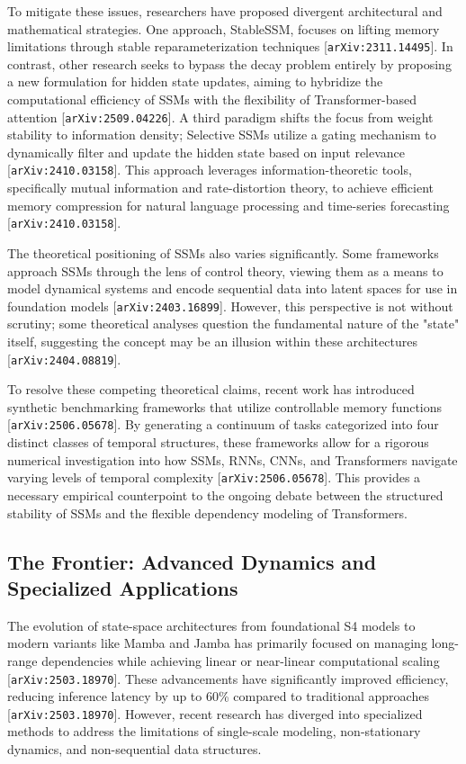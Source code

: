 \documentclass[11pt]{article}
\begin{document}
To mitigate these issues, researchers have proposed divergent architectural and mathematical strategies. One approach, StableSSM, focuses on lifting memory limitations through stable reparameterization techniques [\texttt{arXiv:2311.14495}]. In contrast, other research seeks to bypass the decay problem entirely by proposing a new formulation for hidden state updates, aiming to hybridize the computational efficiency of SSMs with the flexibility of Transformer-based attention [\texttt{arXiv:2509.04226}]. A third paradigm shifts the focus from weight stability to information density; Selective SSMs utilize a gating mechanism to dynamically filter and update the hidden state based on input relevance [\texttt{arXiv:2410.03158}]. This approach leverages information-theoretic tools, specifically mutual information and rate-distortion theory, to achieve efficient memory compression for natural language processing and time-series forecasting [\texttt{arXiv:2410.03158}].

The theoretical positioning of SSMs also varies significantly. Some frameworks approach SSMs through the lens of control theory, viewing them as a means to model dynamical systems and encode sequential data into latent spaces for use in foundation models [\texttt{arXiv:2403.16899}]. However, this perspective is not without scrutiny; some theoretical analyses question the fundamental nature of the "state" itself, suggesting the concept may be an illusion within these architectures [\texttt{arXiv:2404.08819}].

To resolve these competing theoretical claims, recent work has introduced synthetic benchmarking frameworks that utilize controllable memory functions [\texttt{arXiv:2506.05678}]. By generating a continuum of tasks categorized into four distinct classes of temporal structures, these frameworks allow for a rigorous numerical investigation into how SSMs, RNNs, CNNs, and Transformers navigate varying levels of temporal complexity [\texttt{arXiv:2506.05678}]. This provides a necessary empirical counterpoint to the ongoing debate between the structured stability of SSMs and the flexible dependency modeling of Transformers.

\subsection{The Frontier: Advanced Dynamics and Specialized Applications}

The evolution of state-space architectures from foundational S4 models to modern variants like Mamba and Jamba has primarily focused on managing long-range dependencies while achieving linear or near-linear computational scaling [\texttt{arXiv:2503.18970}]. These advancements have significantly improved efficiency, reducing inference latency by up to 60\% compared to traditional approaches [\texttt{arXiv:2503.18970}]. However, recent research has diverged into specialized methods to address the limitations of single-scale modeling, non-stationary dynamics, and non-sequential data structures.
\end{document}

